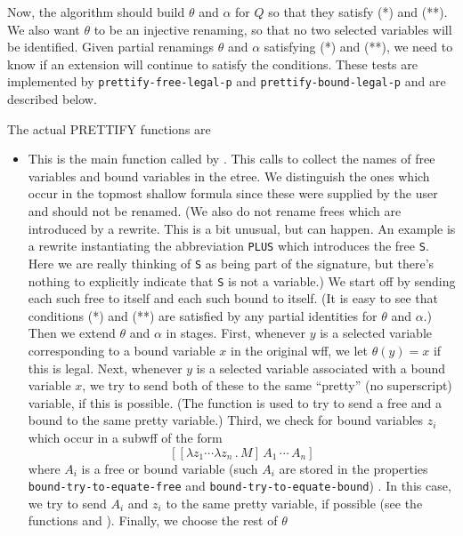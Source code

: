 Now, the algorithm should build $\theta$ and $\alpha$ for $Q$
so that they satisfy (*) and (**).  We also want $\theta$ to
be an injective renaming, so that no two selected variables will
be identified.  Given partial renamings $\theta$ and $\alpha$
satisfying (*) and (**), we need to know if an extension will
continue to satisfy the conditions.  These tests
are implemented by \verb+prettify-free-legal-p+ and \verb+prettify-bound-legal-p+
and are described below.

The actual PRETTIFY functions are
\begin{itemize}
\item {\bf {}}  This is the main function called by {\bf {}}.
This calls {\bf {}} to collect the names of free variables and bound variables
in the etree.  We distinguish the ones which occur in the topmost shallow formula since these were supplied by the
user and should not be renamed.  (We also do not rename frees
which are introduced by a rewrite.  This is a bit unusual, but can happen.  An example is
a rewrite instantiating the abbreviation \verb+PLUS+ which introduces the free \verb+S+.
Here we are really thinking of \verb+S+ as being part of the signature, but there's nothing to explicitly
indicate that \verb+S+ is not a variable.)
We start off by sending each such free to itself and each such bound to itself.
(It is easy to see that conditions (*) and (**) are satisfied by any partial identities for $\theta$ and $\alpha$.)
Then we extend $\theta$ and $\alpha$ in stages.  First, whenever $y$ is a selected variable corresponding to a bound
variable $x$ in the original wff, we let $\theta(y) = x$ if this is legal.  Next, whenever $y$ is a selected variable
associated with a bound variable $x$, we try to send both of these to the same ``pretty'' (no superscript) variable,
if this is possible.  (The function {\bf {}} is used to try to
send a free and a bound to the same pretty variable.)  Third, we check for bound variables $z_i$
which occur in a subwff of the form
$$[[\lambda z_1 \cdots \lambda z_n \, . \, M] \, A_1 \, \cdots\, A_n]$$
where $A_i$ is a free or bound variable
(such $A_i$ are stored in the properties \verb+bound-try-to-equate-free+
and \verb+bound-try-to-equate-bound+)
.  In this case, we try to send $A_i$ and $z_i$ to the same pretty variable,
if possible (see the functions {\bf {}} and
{\bf {}}).  Finally, we choose the rest of $\theta$

\end{itemize}

